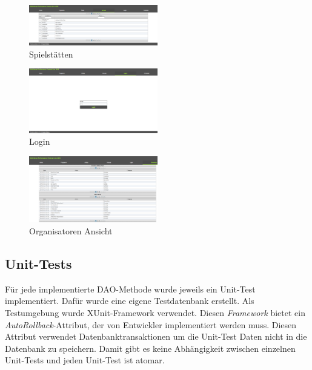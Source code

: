 \documentclass[12pt, a4paper]{article}
\begin{document}
\begin{figure}[h] 	
	\centering
		\includegraphics[width=0.5\textwidth]{ClientListVenues.png}
	\caption{Spielstätten}
\end{figure}

\begin{figure}[h] 	
	\centering
		\includegraphics[width=0.5\textwidth]{ClientLogin.png}
	\caption{Login}
\end{figure}

\begin{figure}[h] 	
	\centering
		\includegraphics[width=0.5\textwidth]{ClientOrganisator.png}
	\caption{Organisatoren Ansicht}
\end{figure}


\clearpage 
\subsection{Unit-Tests}

Für jede implementierte DAO-Methode wurde jeweils ein Unit-Test implementiert. Dafür wurde eine eigene Testdatenbank erstellt. Als Testumgebung wurde XUnit-Framework verwendet. Diesen \textit{Framework} bietet ein \textit{AutoRollback}-Attribut, der von Entwickler implementiert werden muss. Diesen Attribut verwendet Datenbanktransaktionen um die Unit-Test Daten nicht in die Datenbank zu speichern. Damit gibt es keine Abhängigkeit zwischen einzelnen Unit-Tests und jeden Unit-Test ist atomar.


\end{document}
